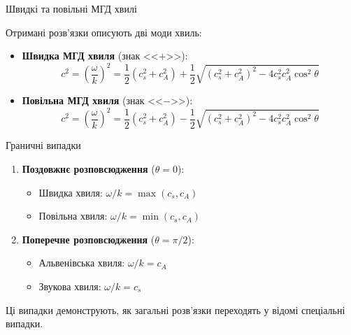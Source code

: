 \documentclass[]{beamer}
\begin{document}
\begin{frame}{Швидкі та повільні МГД хвилі}

Отримані розв'язки описують дві моди хвиль:

\begin{itemize}
\item \textbf{Швидка МГД хвиля} (знак <<$+$>>):
\begin{equation*}
c^2 = \left( \frac{\omega}{k} \right)^2 = \frac{1}{2}(c_s^2 + c_A^2) + \frac{1}{2}\sqrt{(c_s^2 + c_A^2)^2 - 4c_s^2c_A^2 \cos^2 \theta}
\end{equation*}
\item \textbf{Повільна МГД хвиля} (знак <<$-$>>):
\begin{equation*}
c^2 = \left( \frac{\omega}{k} \right)^2 = \frac{1}{2}(c_s^2 + c_A^2) - \frac{1}{2}\sqrt{(c_s^2 + c_A^2)^2 - 4c_s^2c_A^2 \cos^2 \theta}
\end{equation*}
\end{itemize}

\end{frame}

\begin{frame}{Граничні випадки}

\begin{enumerate}
\item \textbf{Поздовжнє розповсюдження} ($\theta = 0$):
\begin{itemize}
\item Швидка хвиля: $\omega/k = \max(c_s, c_A)$
\item Повільна хвиля: $\omega/k = \min(c_s, c_A)$
\end{itemize}

\item \textbf{Поперечне розповсюдження} ($\theta = \pi/2$):
\begin{itemize}
\item Альвенівська хвиля: $\omega/k = c_A$
\item Звукова хвиля: $\omega/k = c_s$
\end{itemize}
\end{enumerate}

\medskip
Ці випадки демонструють, як загальні розв'язки переходять у відомі спеціальні випадки.
\end{frame}
\end{document}
